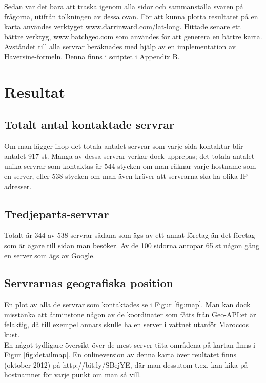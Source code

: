 \documentclass[a4paper]{article}
\begin{document}
Sedan var det bara att traska igenom alla sidor och sammanställa svaren på frågorna, utifrån tolkningen av dessa ovan. För att kunna plotta resultatet på en karta användes verktyget www.darrinward.com/lat-long. Hittade senare ett bättre verktyg, www.batchgeo.com som användes för att generera en bättre karta.\\

Avståndet till alla servrar beräknades med hjälp av en implementation av Haversine-formeln. Denna finns i scriptet i Appendix B.


\section{Resultat}
\subsection{Totalt antal kontaktade servrar}
Om man lägger ihop det totala antalet servrar som varje sida kontaktar blir antalet 917 st. Många av dessa servrar verkar dock upprepas; det totala antalet unika servrar som kontaktas är 544 stycken om man räknar varje hostname som en server, eller 538 stycken om man även kräver att servrarna ska ha olika IP-adresser.\\

\subsection{Tredjeparts-servrar}
Totalt är 344 av 538 servrar sådana som ägs av ett annat företag än det företag som är ägare till sidan man besöker. Av de 100 sidorna anropar 65 st någon gång en server som ägs av Google.

\subsection{Servrarnas geografiska position}
En plot av alla de servrar som kontaktades se i Figur \ref{fig:map}. Man kan dock misstänka att åtminstone någon av de koordinater som fåtts från Geo-API:et är felaktig, då till exempel annars skulle ha en server i vattnet utanför Maroccos kust.\\

En något tydligare översikt över de mest server-täta områdena på kartan finns i Figur \ref{fig:detailmap}. En onlineversion av denna karta över reultatet finns (oktober 2012) på http://bit.ly/SBejYE, där man dessutom t.ex. kan kika på hostnamnet för varje punkt om man så vill.\\
\end{document}

